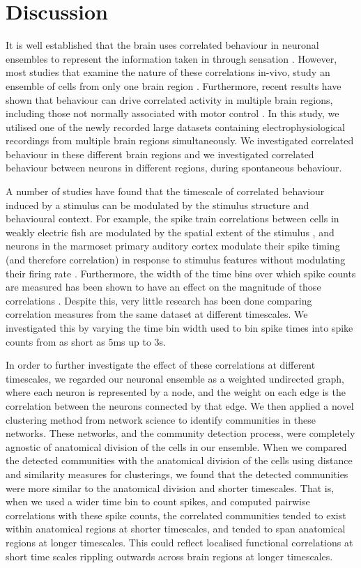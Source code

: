 \section{Discussion}
It is well established that the brain uses correlated behaviour in neuronal ensembles to represent the information taken in through sensation \parencite{cohen1, litwinkumar, decharms}. However, most studies that examine the nature of these correlations in-vivo, study an ensemble of cells from only one brain region \parencite{cohen2}. Furthermore, recent results have shown that behaviour can drive correlated activity in multiple brain regions, including those not normally associated with motor control \parencite{stringer}. In this study, we utilised one of the newly recorded large datasets containing electrophysiological recordings from multiple brain regions simultaneously. We investigated correlated behaviour in these different brain regions and we investigated correlated behaviour between neurons in different regions, during spontaneous behaviour.

A number of studies have found that the timescale of correlated behaviour induced by a stimulus can be modulated by the stimulus structure and behavioural context. For example, the spike train correlations between cells in weakly electric fish are modulated by the spatial extent of the stimulus \parencite{litwinkumar}, and neurons in the marmoset primary auditory cortex modulate their spike timing (and therefore correlation) in response to stimulus features without modulating their firing rate  \parencite{decharms}. Furthermore, the width of the time bins over which spike counts are measured has been shown to have an effect on the magnitude of those correlations \parencite{cohen2}. Despite this, very little research has been done comparing correlation measures from the same dataset at different timescales. We investigated this by varying the time bin width used to bin spike times into spike counts from as short as $5$ms up to $3$s.

In order to further investigate the effect of these correlations at different timescales, we regarded our neuronal ensemble as a weighted undirected graph, where each neuron is represented by a node, and the weight on each edge is the correlation between the neurons connected by that edge. We then applied a novel clustering method from network science \parencite{humphries} to identify communities in these networks. These networks, and the community detection process, were completely agnostic of anatomical division of the cells in our ensemble. When we compared the detected communities with the anatomical division of the cells using distance and similarity measures for clusterings, we found that the detected communities were more similar to the anatomical division and shorter timescales. That is, when we used a wider time bin to count spikes, and computed pairwise correlations with these spike counts, the correlated communities tended to exist within anatomical regions at shorter timescales, and tended to span anatomical regions at longer timescales. This could reflect localised functional correlations at short time scales rippling outwards across brain regions at longer timescales.

